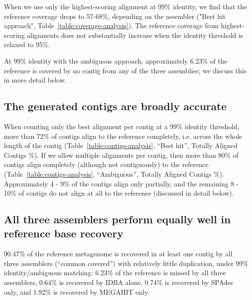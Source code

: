 \documentclass[10pt,a4paper,twocolumn]{article}
\begin{document}

When we use only the highest-scoring alignment at 99\% identity, we
find that the reference coverage drops to 57-68\%, depending on the
assembler ("Best hit approach",
Table~\ref{table:coverage-analysis}). The reference coverage from
highest-scoring alignments does not substantially increase when the
identity threshold is relaxed to 95\%.

At 99\% identity with the ambiguous approach, approximately 6.23\% of
the reference is covered by no contig from any of the three
assemblies; we discuss this in more detail below.

\subsection*{The generated contigs are broadly accurate} 

When counting only the best alignment per contig at a 99\%
identity threshold, more than 72\% of contigs align to the reference
completely, i.e. across the whole length of the contig (Table~\ref{table:contigs-analysis}, ``Best hit'', Totally Aligned Contigs \%).  If we allow
multiple alignments per contig, then more than 80\% of contigs align
completely (although not contiguously) to the reference (Table~\ref{table:contigs-analysis}, ``Ambiguous'', Totally Aligned Contigs \%).
Approximately 4 - 9\% of the contigs align only partially, and the
remaining 8 - 10\% of contigs do not align at all to the reference
(discussed in detail below).

\subsection*{All three assemblers perform equally well in reference base recovery}


90.47\% of the reference metagenome is recovered in at least one
contig by all three assemblers (``common covered'') with relatively
little duplication, under 99\% identity/ambiguous matching: 6.23\% of
the reference is missed by all three assemblers, 0.64\% is recovered
by IDBA alone, 0.74\% is recovered by SPAdes only, and 1.92\% is
recovered by MEGAHIT only.
\end{document}
